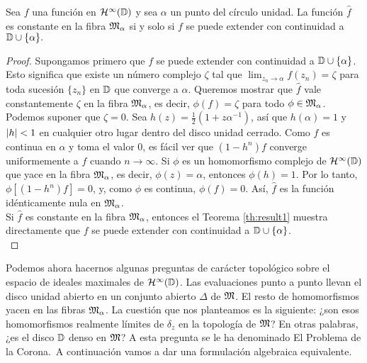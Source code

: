 \begin{theorem}
    Sea $f$ una función en $\mathcal{H}^{\infty}(\mathbb{D})$ y sea $\alpha$ un punto del círculo unidad. La función $\widehat f$ es constante en la fibra $\mathfrak{M}_\alpha$ si y solo si $f$ se puede extender con continuidad a $\mathbb{D} \cup \{\alpha\}.$
\end{theorem}

\begin{proof}
    Supongamos primero que $f$ se puede extender con continuidad a $\mathbb{D} \cup \{ \alpha\}$. Esto significa que existe un número complejo $\zeta$ tal que $\lim_{z_n \to \alpha} f(z_n) = \zeta$ para toda sucesión $\{z_n\}$ en $\mathbb{D}$ que converge a $\alpha$. Queremos mostrar que $\widehat f$ vale constantemente $\zeta$ en la fibra $\mathfrak{M}_\alpha$, es decir, $\phi(f) = \zeta$ para todo $\phi \in \mathfrak{M}_\alpha$. \\

    Podemos suponer que $\zeta = 0$. Sea $h(z) = \frac{1}{2} (1 + z \alpha^{-1})$, así que $h(\alpha) = 1$ y $\left\lvert h\right\rvert < 1$ en cualquier otro lugar dentro del disco unidad cerrado. Como $f$ es continua en $\alpha$ y toma el valor $0$, es fácil ver que $(1 - h^n) f$ converge uniformemente a $f$ cuando $n \to \infty$. Si $\phi$ es un homomorfismo complejo de $\mathcal{H}^{\infty}(\mathbb{D})$ que yace en la fibra $\mathfrak{M}_\alpha$, es decir, $\phi (z) = \alpha$, entonces $\phi (h) = 1$. Por lo tanto, $\phi [(1 - h^n)f] = 0$, y, como $\phi$ es continua, $\phi (f) = 0$. Así, $\widehat f$ es la función idénticamente nula en $\mathfrak{M}_\alpha$. \\


    Si $\widehat f$ es constante en la fibra $\mathfrak{M}_\alpha$, entonces el Teorema \ref{th:result1} muestra directamente que $f$ se puede extender con continuidad a $\mathbb{D} \cup \{ \alpha \}$. \\
\end{proof}


Podemos ahora hacernos algunas preguntas de carácter topológico sobre el espacio de ideales maximales de $\mathcal{H}^{\infty}(\mathbb{D})$. Las evaluaciones punto a punto llevan el disco unidad abierto en un conjunto abierto $\Delta$ de $\mathfrak{M}$. El resto de homomorfismos yacen en las fibras $\mathfrak{M}_\alpha$. La cuestión que nos planteamos es la siguiente: ¿son esos homomorfismos realmente límites de $\delta_z$ en la topología de $\mathfrak{M}$? En otras palabras, ¿es el disco $\mathbb{D}$ denso en $\mathfrak{M}$? A esta
pregunta se le ha denominado El Problema de la Corona. A continuación vamos a dar una formulación algebraica equivalente.\\

